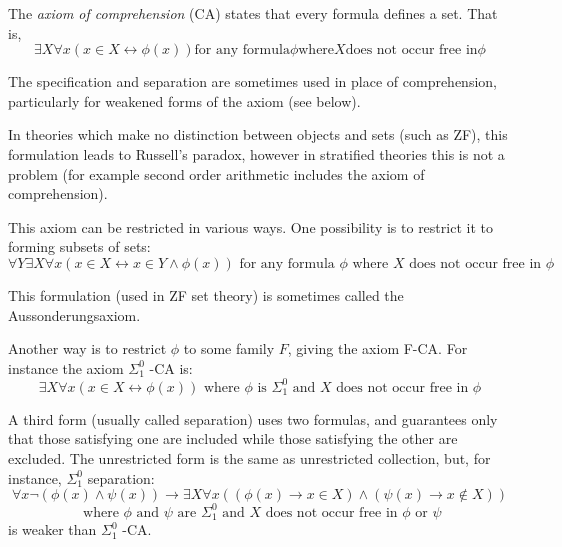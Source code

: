 \documentclass[12pt]{article}
\begin{document}


The \emph{axiom of comprehension} (CA) states that every formula defines a set.  That is,
$$\exists X\forall x(x\in X\leftrightarrow\phi(x))\text{for any formula}\phi\text{where}X\text{does not occur free in}\phi$$

The  specification and separation are sometimes used in place of comprehension, particularly for weakened forms of the axiom (see below).

In theories which make no distinction between objects and sets (such as ZF), this formulation leads to Russell's paradox, however in stratified theories this is not a problem (for example second order arithmetic includes the axiom of comprehension).

This axiom can be restricted in various ways.  One possibility is to restrict it to forming subsets of sets:
$$\forall Y\exists X\forall x(x\in X\leftrightarrow x\in Y\wedge\phi(x))\text{ for any formula }\phi\text{ where }X\text{ does not occur free in }\phi$$

This formulation (used in ZF set theory) is sometimes called the Aussonderungsaxiom.

Another way is to restrict $\phi$ to some family $F$, giving the axiom F-CA.  For instance the axiom $\Sigma^0_1$ -CA is:
$$\exists X\forall x(x\in X\leftrightarrow\phi(x))\text{ where }\phi\text{ is }\Sigma^0_1\text{ and }X\text{ does not occur free in }\phi$$

A third form (usually called separation) uses two formulas, and guarantees only that those satisfying one are included while those satisfying the other are excluded.  The unrestricted form is the same as unrestricted collection, but, for instance, $\Sigma^0_1$ separation:
$$\forall x\neg(\phi(x)\wedge\psi(x))\rightarrow\exists X\forall x((\phi(x)\rightarrow x\in X)\wedge(\psi(x)\rightarrow x\notin X))$$$$\text{ where }\phi\text{ and }\psi\text{ are }\Sigma^0_1\text{ and }X\text{ does not occur free in }\phi\text{ or }\psi$$
is weaker than $\Sigma^0_1$ -CA.
\end{document}
